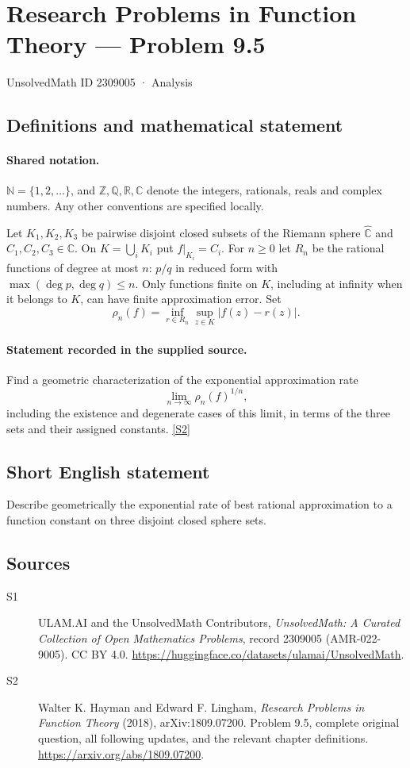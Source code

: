 \documentclass[11pt]{book}
\newcommand{\sref}[2]{\hyperlink{source:#1:#2}{[S#2]}}
\begin{document}
\setcounter{section}{2309004}
\section{Research Problems in Function Theory — Problem 9.5}\label{2309005}
{\small\sffamily UnsolvedMath ID 2309005 · Analysis}
\subsection{Definitions and mathematical statement}

\paragraph{Shared notation.}$\mathbb N=\{1,2,\ldots\}$, and $\mathbb Z,\mathbb Q,\mathbb R,\mathbb C$ denote the integers, rationals, reals and complex numbers. Any other conventions are specified locally.


Let $K_1,K_2,K_3$ be pairwise disjoint closed subsets of the Riemann sphere $\widehat{\mathbb C}$ and $C_1,C_2,C_3\in\mathbb C$. On $K=\bigcup_iK_i$ put $f|_{K_i}=C_i$. For $n\ge0$ let $R_n$ be the rational functions of degree at most $n$: $p/q$ in reduced form with $\max(\deg p,\deg q)\le n$. Only functions finite on $K$, including at infinity when it belongs to $K$, can have finite approximation error. Set \[\rho_n(f)=\inf_{r\in R_n}\sup_{z\in K}|f(z)-r(z)|.\]
\paragraph{Statement recorded in the supplied source.}
Find a geometric characterization of the exponential approximation rate \[\lim_{n\to\infty}\rho_n(f)^{1/n},\] including the existence and degenerate cases of this limit, in terms of the three sets and their assigned constants. \sref{2309005}{2}
\subsection{Short English statement}
Describe geometrically the exponential rate of best rational approximation to a function constant on three disjoint closed sphere sets.
\subsection{Sources}
\begin{description}
\item[\hypertarget{source:2309005:1}{S1}] ULAM.AI and the UnsolvedMath Contributors, \emph{UnsolvedMath: A Curated Collection of Open Mathematics Problems}, record 2309005 (AMR-022-9005). CC BY 4.0. \url{https://huggingface.co/datasets/ulamai/UnsolvedMath}.
\item[\hypertarget{source:2309005:2}{S2}] Walter K. Hayman and Edward F. Lingham, \emph{Research Problems in Function Theory} (2018), arXiv:1809.07200. Problem 9.5, complete original question, all following updates, and the relevant chapter definitions. \url{https://arxiv.org/abs/1809.07200}.
\end{description}
\label{end:2309005}
\end{document}
